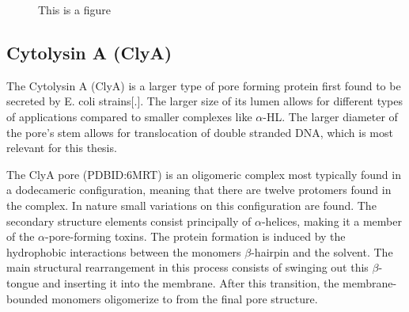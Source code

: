 \begin{figure}[ht]
\begin{centering}
  \caption{This is a figure}
  \label{fig:alphaHL}
  \end{centering}
\end{figure}

\newpage
\subsection{Cytolysin A (ClyA)}

The Cytolysin A (ClyA) is a larger type of pore forming protein first found to be
secreted by E. coli strains[.]. The larger size of its lumen allows for different types
of applications compared to smaller complexes like $\alpha$-HL. The larger diameter of
the pore's stem allows for translocation of double stranded DNA, which is most relevant
for this thesis.

The ClyA pore (PDBID:6MRT\cite{Peng2019}) is an oligomeric complex most typically found
 in a dodecameric configuration, meaning that there are twelve protomers found in the
complex. In nature small variations on this configuration are found. The secondary
structure elements consist principally of $\alpha$-helices, making it a member of the $
\alpha$-pore-forming toxins. The protein formation is induced by the hydrophobic
interactions between the monomers $\beta$-hairpin and the solvent. The main
structural rearrangement in this process consists of swinging out this $\beta$-tongue and
inserting it into the membrane. After this transition, the membrane-bounded monomers
oligomerize to from the final pore structure.


